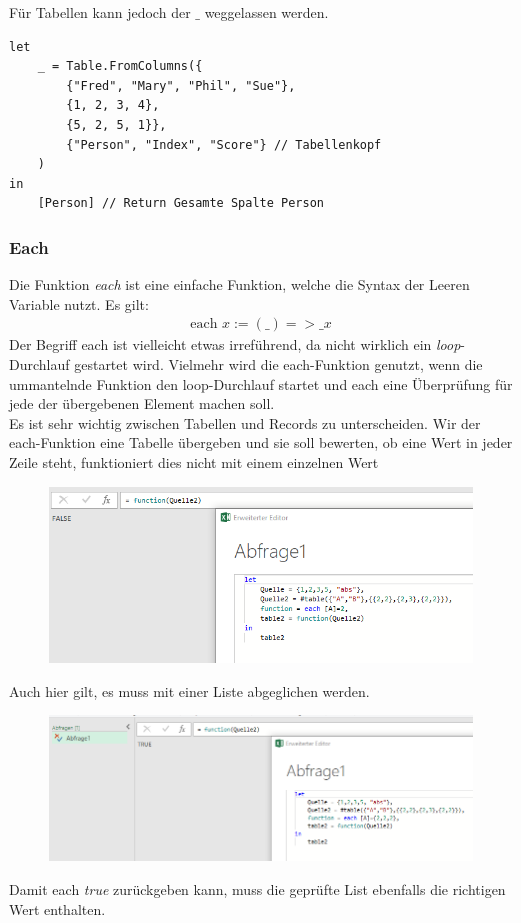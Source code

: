 Für Tabellen kann jedoch der $\_$ weggelassen werden.

 \begin{lstlisting}[style=M]
let
	_ = Table.FromColumns({
		{"Fred", "Mary", "Phil", "Sue"},
		{1, 2, 3, 4},
		{5, 2, 5, 1}},
		{"Person", "Index", "Score"} // Tabellenkopf
	)
in
	[Person] // Return Gesamte Spalte Person
\end{lstlisting}
\subsubsection{Each}
Die Funktion \textit{each} ist eine einfache Funktion, welche die Syntax der Leeren Variable nutzt. Es gilt:
\begin{align}
\text{each }x := (\_) => \_ x 
\end{align} 
Der Begriff each ist vielleicht etwas irreführend, da nicht wirklich ein \textit{loop}-Durchlauf gestartet wird. Vielmehr wird die each-Funktion genutzt, wenn die ummantelnde Funktion den loop-Durchlauf startet und each eine Überprüfung für jede der übergebenen Element machen soll. \\

Es ist sehr wichtig zwischen Tabellen und Records zu unterscheiden. Wir der each-Funktion eine Tabelle übergeben und sie soll bewerten, ob eine Wert in jeder Zeile steht, funktioniert dies nicht mit einem einzelnen Wert

\begin{figure}[H]
	\centering
	\includegraphics[scale = 0.3]{attachment/chapter_1/screenshot039}
	\caption{}
	\label{fig:screenshot039}
\end{figure}
Auch hier gilt, es muss mit einer Liste abgeglichen werden.

\begin{figure}[H]
	\centering
	\includegraphics[scale = 0.3]{attachment/chapter_1/screenshot040}
	\caption{}
	\label{fig:screenshot040}
\end{figure}
Damit each \textit{true} zurückgeben kann, muss die geprüfte List ebenfalls die richtigen Wert enthalten.

